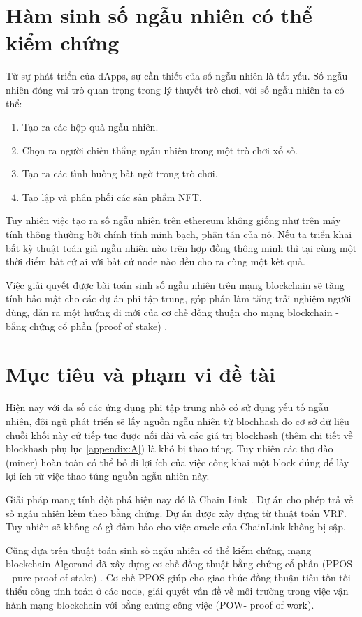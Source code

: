 \documentclass[../main.tex]{subfiles}
\begin{document}
\section{Hàm sinh số ngẫu nhiên có thể kiểm chứng}
Từ sự phát triển của dApps, sự cần thiết của số ngẫu nhiên là tất yếu.
Số ngẫu nhiên đóng vai trò quan trọng trong lý thuyết trò chơi, với số ngẫu nhiên ta có thể:
\begin{enumerate}
    \item Tạo ra các hộp quà ngẫu nhiên.
    \item Chọn ra người chiến thắng ngẫu nhiên trong một trò chơi xổ số.
    \item Tạo ra các tình huống bất ngờ trong trò chơi.
    \item Tạo lập và phân phối các sản phẩm NFT.
\end{enumerate}
Tuy nhiên việc tạo ra số ngẫu nhiên trên ethereum không giống như trên máy tính thông thường bởi chính tính minh bạch, phân tán của nó. Nếu ta triển khai bất kỳ thuật toán giả ngẫu nhiên nào trên hợp đồng thông minh thì tại cùng một thời điểm bất cứ ai với bất cứ node nào đều cho ra cùng một kết quả.

Việc giải quyết được bài toán sinh số ngẫu nhiên trên mạng blockchain sẽ tăng tính bảo mật cho các dự án phi tập trung, góp phần làm tăng trải nghiệm người dùng, dẫn ra một hướng đi mới của cơ chế đồng thuận cho mạng blockchain - bằng chứng cổ phần (proof of stake) \cite{chen2016algorand}.

\section{Mục tiêu và phạm vi đề tài}
Hiện nay với đa số các ứng dụng phi tập trung nhỏ có sử dụng yếu tố ngẫu nhiên, đội ngũ phát triển sẽ lấy nguồn ngẫu nhiên từ blochhash do cơ sở dữ liệu chuỗi khối này cứ tiếp tục được nối dài và các giá trị blockhash (thêm chi tiết về blockhash phụ lục \ref{appendix:A}) là khó bị thao túng. Tuy nhiên các thợ đào (miner) hoàn toàn có thể bỏ đi lợi ích của việc công khai một block đúng để lấy lợi ích từ việc thao túng nguồn ngẫu nhiên này. 

Giải pháp mang tính đột phá hiện nay đó là Chain Link \cite{chainlink}. Dự án cho phép trả về số ngẫu nhiên kèm theo bằng chứng. Dự án được xây dựng từ thuật toán VRF. Tuy nhiên sẽ không có gì đảm bảo cho việc oracle của ChainLink không bị sập.

Cũng dựa trên thuật toán sinh số ngẫu nhiên có thể kiểm chứng, mạng blockchain Algorand đã xây dựng cơ chế đồng thuật bằng chứng cổ phần (PPOS - pure proof of stake) \cite{chen2016algorand}. Cơ chế PPOS giúp cho giao thức đồng thuận tiêu tốn tối thiểu công tính toán ở các node, giải quyết vấn đề về môi trường trong việc vận hành mạng blockchain với bằng chứng công việc (POW- proof of work). 
\end{document}
